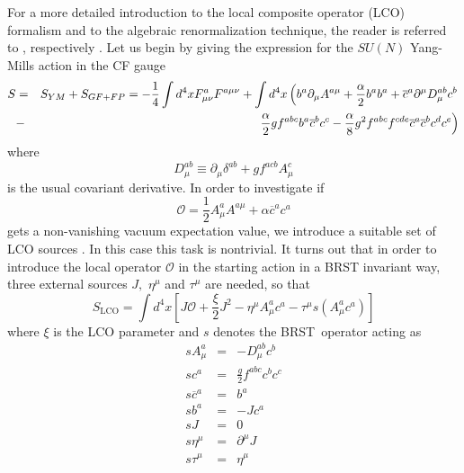\documentclass[a4paper,12pt]{article}
\begin{document}
\label{sec1} For a more detailed introduction to the local composite
operator (LCO) formalism and to the algebraic renormalization technique, the
reader is referred to \cite{v1,Knecht:2001cc}, respectively \cite{book}.%
\newline
\newline
Let us begin by giving the expression for the $SU(N)$ Yang-Mills action in
the CF gauge
\begin{eqnarray}
S &=&S_{YM}+S_{GF+FP}=-\frac{1}{4}\int d^{4}xF_{\mu \nu }^{a}F^{a\mu \nu
}+\int d^{4}x\left( b^{a}\partial _{\mu }A^{a\mu }+\frac{\alpha }{2}%
b^{a}b^{a}+\overline{c}^{a}\partial ^{\mu }D_{\mu }^{ab}c^{b}\right.
\nonumber \\
&-&\left. \frac{\alpha }{2}gf^{abc}b^{a}\overline{c}^{b}c^{c}-\frac{\alpha }{%
8}g^{2}f^{abc}f^{cde}\overline{c}^{a}\overline{c}^{b}c^{d}c^{e}\right)
\label{cfa}
\end{eqnarray}
where
\begin{equation}
D_{\mu }^{ab}\equiv \partial _{\mu }\delta ^{ab}+gf^{acb}A_{\mu }^{c}
\label{dudal0}
\end{equation}
is the usual covariant derivative. In order to investigate if
\begin{equation}
\mathcal{O}=\frac{1}{2}A_{\mu }^{a}A^{a\mu }+\alpha \overline{c}^{a}c^{a}
\label{op}
\end{equation}
gets a non-vanishing vacuum expectation value, we introduce a suitable set
of LCO sources \cite{v1, Knecht:2001cc}. In this case this task is
nontrivial. It turns out that in order to introduce the local operator $%
\mathcal{O}$ in the starting action in a BRST invariant way, three external
sources $J,$ $\eta ^{\mu }$ and $\tau ^{\mu }$ are needed, so that
\begin{equation}
S_{\mathrm{LCO}}=\int d^{4}x\left[ J\mathcal{O} +\frac{\xi }{2}J^{2}-\eta
^{\mu }A_{\mu }^{a}c^{a}-\tau ^{\mu }s(A_{\mu }^{a}c^{a})\right]  \label{lco}
\end{equation}
where $\xi $ is the LCO parameter and $s$ denotes the BRST\ operator acting
as
\begin{eqnarray}
sA_{\mu }^{a} &=&-D_{\mu }^{ab}c^{b}  \nonumber \\
sc^{a} &=&\frac{g}{2}f^{abc}c^{b}c^{c}  \nonumber \\
s\overline{c}^{a} &=&b^{a}  \nonumber \\
sb^{a} &=&-Jc^{a}  \nonumber \\
sJ &=&0  \nonumber \\
s\eta ^{\mu } &=&\partial ^{\mu }J  \nonumber \\
s\tau ^{\mu } &=&\eta ^{\mu }  \label{s}
\end{eqnarray}
\end{document}
